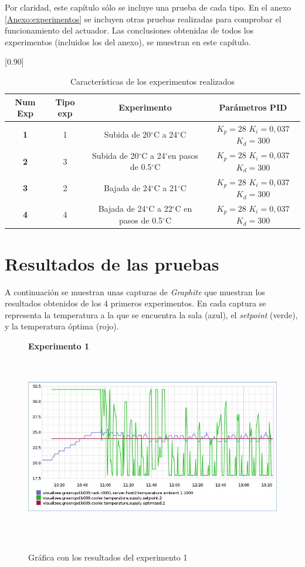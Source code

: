 	Por claridad, este capítulo sólo se incluye una prueba de cada tipo. En el anexo \ref{Anexo:experimentos} se incluyen otras pruebas realizadas para comprobar el funcionamiento del actuador. Las conclusiones obtenidas de todos los experimentos (incluidos los del anexo), se muestran en este capítulo.

\begin{table}[h]
\centering
\scalebox{0.80}[0.90]{
	\begin{tabular}{| c | c | c | c |}
		\hline
		\textbf{Num Exp} & \textbf{Tipo exp} &\textbf{Experimento}  & \textbf{Parámetros PID}\\
		\hline \hline
			\textbf{1} & 1 &Subida de 20{$^\circ$}C a 24{$^\circ$}C  & $K_{p}=28$ $K_{i}=0,037$  $ K_{d}=300$\\
		\hline
			\textbf{2} & 3 &Subida de 20{$^\circ$}C a 24{$^\circ$}en pasos de 0.5{$^\circ$}C & $K_{p}=28$ $K_{i}=0,037$  $ K_{d}=300$ \\
		\hline
			\textbf{3} & 2 & Bajada de 24{$^\circ$}C a 21{$^\circ$}C & $K_{p}=28$ $K_{i}=0,037$  $ K_{d}=300$\\
		\hline
			\textbf{4} & 4 &Bajada de 24{$^\circ$}C a 22{$^\circ$}C en pasos de 0.5{$^\circ$}C & $K_{p}=28$ $K_{i}=0,037$  $ K_{d}=300$\\
		\hline	
\end{tabular}}
\label{tabla6_1:pruebas}\caption{Características de los experimentos realizados}
 \end{table}

\section{Resultados de las pruebas}\label{sec:resultados}
A continuación se muestran unas capturas de \textit{Graphite} que muestran los resultados obtenidos de los 4 primeros experimentos. En cada captura se representa la temperatura a la que se encuentra la sala (azul), el \textit{setpoint} (verde), y la temperatura óptima (rojo).

\begin{figure}[htbp]
\centering
\textbf{Experimento 1}\\
\includegraphics[width=120mm,height=85mm]{imagenes/capitulo6/experimento1}
\caption {Gráfica con los resultados del experimento 1}
\label{fig6_1:experimento1}
\end{figure}

